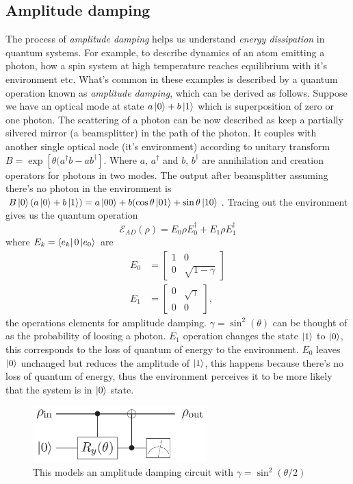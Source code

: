 \subsection{Amplitude damping}
The process of \textit{amplitude damping} helps us understand \textit{energy dissipation} in quantum systems. For example, to describe dynamics of an atom emitting a photon, how a spin system at high temperature reaches equilibrium with it's environment etc. What's common in these examples is described by a quantum operation known as \textit{amplitude damping}, which can be derived as follows. Suppose we have an optical mode at state $a\ket{0}+b\ket{1}$ which is superposition of zero or one photon. The scattering of a photon can be now described as keep a partially silvered mirror (a beamsplitter) in the path of the photon. It couples with another single optical node (it's environment) according to unitary transform $B = \exp{\left[ \theta(a^\dag b - ab^\dag \right]}$. Where $a$, $a^\dag$ and $b$, $b^\dag$ are annihilation and creation operators for photons in two modes. The output after beamsplitter assuming there's no photon in the environment is $B\ket{0}(a\ket{0}+b\ket{1}) = a\ket{00} + b(\cos{\theta}\ket{01} + \sin{\theta}\ket{10}$. Tracing out the environment gives us the quantum operation
\begin{equation}
    \mathcal{E}_{AD}(\rho) = E_0\rho E_0^\dag + E_1\rho E_1^\dag
\end{equation}
where $E_k=\bra{e_k}0\ket{e_0}$ are
\begin{align}
    E_0 &= \begin{bmatrix}
        1 & 0 \\ 0 & \sqrt{1-\gamma}
    \end{bmatrix} \\
    E_1 &= \begin{bmatrix}
        0 & \sqrt{\gamma} \\ 0 & 0
    \end{bmatrix},
\end{align}
the operations elements for amplitude damping. $\gamma = \sin^2(\theta)$ can be thought of as the probability of loosing a photon. $E_1$ operation changes the state $\ket{1}$ to $\ket{0}$, this corresponds to the loss of quantum of energy to the environment. $E_0$ leaves $\ket{0}$ unchanged but reduces the amplitude of $\ket{1}$, this happens because there's no loss of quantum of energy, thus the environment perceives it to be more likely that the system is in $\ket{0}$ state.
\begin{figure}[H]
    \centering
    \includegraphics[width=0.6\textwidth]{images/amplitude_damp_circuit.png}
    \caption{This models an amplitude damping circuit with $\gamma = \sin^2(\theta/2)$}
    \label{fig:amplitude_damp_circuit}
\end{figure}
